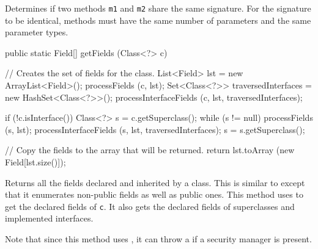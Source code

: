 \begin{tabb}   Determines if two methods \texttt{m1} and \texttt{m2}
 share the same signature. For the signature to be identical,
 methods must have the same
 number of parameters and the same parameter types.
\end{tabb}
\begin{htmlonly}
\end{htmlonly}
\begin{code}

   public static Field[] getFields (Class<?> c)\begin{hide} {
      // Creates the set of fields for the class.
      List<Field> lst = new ArrayList<Field>();
      processFields (c, lst);
      Set<Class<?>> traversedInterfaces = new HashSet<Class<?>>();
      processInterfaceFields (c, lst, traversedInterfaces);

      if (!c.isInterface()) {
         Class<?> s = c.getSuperclass();
         while (s != null) {
            processFields (s, lst);
            processInterfaceFields (s, lst, traversedInterfaces);
            s = s.getSuperclass();
         }
      }

      // Copy the fields to the array that will be returned.
      return lst.toArray (new Field[lst.size()]);
   }\end{hide}
\end{code}
\begin{tabb}   Returns all the fields declared and inherited
 by a class. This is similar to 
 except that it enumerates non-public fields as well as public ones.
 This method uses 
 to get the declared fields of \texttt{c}.
 It also gets the declared fields of superclasses and implemented
 interfaces.

 Note that since this method uses
 ,
 it can throw a  if
 a security manager is present.
\end{tabb}
\begin{htmlonly}
\end{htmlonly}
